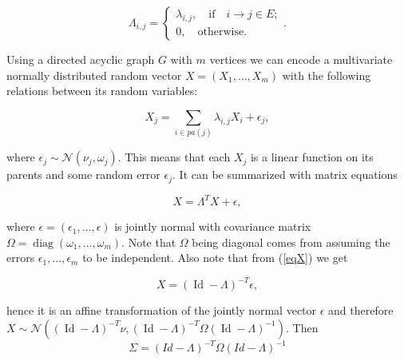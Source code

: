 \documentclass[10pt,a4paper]{article}
\begin{document}
\[
\Lambda_{i,j}=
	\begin{cases}
	\lambda_{i,j}, \quad \text{if} \quad i \rightarrow j \in E;\\
	0 ,\quad \text{otherwise}.
	\end{cases}.
\]

Using a directed acyclic graph $G$ with $m$ vertices we can encode a multivariate normally distributed random vector $X=(X_1,\dots,X_m)$ with the following relations between its random variables:

\[X_j=\sum\limits_{i \in pa(j)}\lambda_{i,j}X_i+\epsilon_j,\]

\noindent
where $\epsilon_j\sim\mathcal{N}(\nu_j,\omega_j)$. This means that each $X_j$ is a linear function on its parents and some random error $\epsilon_j$. It can be summarized with matrix equations

\begin{equation}\label{eqX}
X=\Lambda^T X+\epsilon,
\end{equation}

\noindent
where $\epsilon=(\epsilon_1,\dots,\epsilon)$ is jointly normal with covariance matrix $\Omega=\operatorname{diag}(\omega_1,\dots,\omega_m)$. Note that $\Omega$ being diagonal comes from assuming the errors $\epsilon_1,\dots,\epsilon_m$ to be independent. Also note that from (\ref{eqX}) we get

\[X=(\operatorname{Id}-\Lambda)^{-T}\epsilon,\]

\noindent
hence it is an affine transformation of the jointly normal vector $\epsilon$ and therefore $X\sim\mathcal{N}((\operatorname{Id}-\Lambda)^{-T}\nu, (\operatorname{Id}-\Lambda)^{-T}\Omega(\operatorname{Id}-\Lambda)^{-1})$. Then
\begin{equation}
\Sigma=(Id-\Lambda)^{-T}\Omega(Id-\Lambda)^{-1}
\end{equation}
\end{document}
